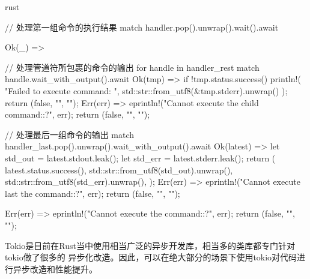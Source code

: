 \begin{code-block}{rust}
{    // 处理第一组命令的执行结果
    match handler.pop().unwrap().wait().await {
        Ok(_) => {
            // 处理管道符所包裹的命令的输出
            for handle in handler_rest {
                match handle.wait_with_output().await {
                    Ok(tmp) => {
                        if !tmp.status.success() {
                            println!(
                                "Failed to execute command: {}",
                                std::str::from_utf8(&tmp.stderr).unwrap()
                            );
                            return (false, "", "");
                        }
                    }
                    Err(err) => {
                        eprintln!("Cannot execute the child command:{:?}", err);
                        return (false, "", "");
                    }
                }
            }

            // 处理最后一组命令的输出
            match handler_last.pop().unwrap().wait_with_output().await {
                Ok(latest) => {
                    let std_out = latest.stdout.leak();
                    let std_err = latest.stderr.leak();
                    return (
                        latest.status.success(),
                        std::str::from_utf8(std_out).unwrap(),
                        std::str::from_utf8(std_err).unwrap(),
                    );
                }
                Err(err) => {
                    eprintln!("Cannot execute last the command:{:?}", err);
                    return (false, "", "");
                }
            }
        }
        Err(err) => {
            eprintln!("Cannot execute the command:{:?}", err);
            return (false, "", "");
        }
    }
}
\end{code-block}

Tokio是目前在Rust当中使用相当广泛的异步开发库，相当多的类库都专门针对tokio做了很多的
异步化改造。因此，可以在绝大部分的场景下使用tokio对代码进行异步改造和性能提升。


